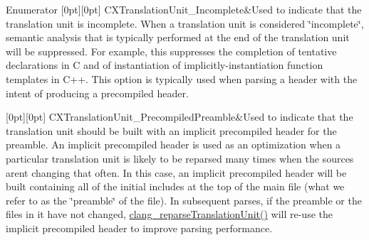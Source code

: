 \begin{DoxyEnumFields}{Enumerator}
[0pt][0pt]{}\mbox{\label{group__CINDEX__TRANSLATION__UNIT_ggab1e4965c1ebe8e41d71e90203a723fe9ad7cfbf9284a37c4324fc86fc7e4bcfc1}} 
C\+X\+Translation\+Unit\+\_\+\+Incomplete&Used to indicate that the translation unit is incomplete. When a translation unit is considered \char`\"{}incomplete\char`\"{}, semantic analysis that is typically performed at the end of the translation unit will be suppressed. For example, this suppresses the completion of tentative declarations in C and of instantiation of implicitly-\/instantiation function templates in C++. This option is typically used when parsing a header with the intent of producing a precompiled header. \\
\hline

[0pt][0pt]{}\mbox{\label{group__CINDEX__TRANSLATION__UNIT_ggab1e4965c1ebe8e41d71e90203a723fe9a790e560dd51389cb9dc370fe40ba60f8}} 
C\+X\+Translation\+Unit\+\_\+\+Precompiled\+Preamble&Used to indicate that the translation unit should be built with an implicit precompiled header for the preamble. An implicit precompiled header is used as an optimization when a particular translation unit is likely to be reparsed many times when the sources aren\textquotesingle{}t changing that often. In this case, an implicit precompiled header will be built containing all of the initial includes at the top of the main file (what we refer to as the \char`\"{}preamble\char`\"{} of the file). In subsequent parses, if the preamble or the files in it have not changed, {\ttfamily \hyperlink{group__CINDEX__TRANSLATION__UNIT_ga524e76bf2a809d037934d4be51ea448a}{clang\+\_\+reparse\+Translation\+Unit()}} will re-\/use the implicit precompiled header to improve parsing performance. \\
\hline


\end{DoxyEnumFields}
